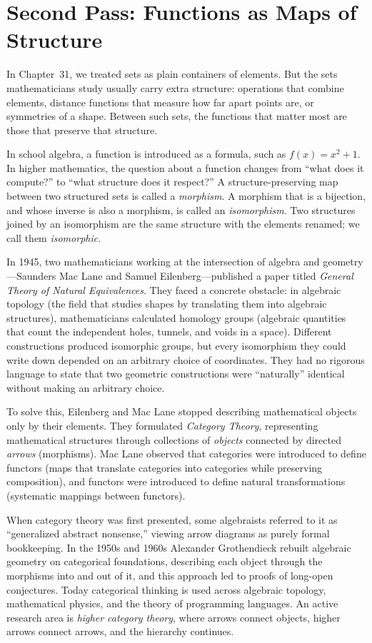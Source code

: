 \section{Second Pass: Functions as Maps of Structure}
\chapterline

In Chapter~31, we treated sets as plain containers of elements. But the sets mathematicians study usually carry extra structure: operations that combine elements, distance functions that measure how far apart points are, or symmetries of a shape. Between such sets, the functions that matter most are those that preserve that structure.

In school algebra, a function is introduced as a formula, such as $f(x) = x^2 + 1$. In higher mathematics, the question about a function changes from ``what does it compute?'' to ``what structure does it respect?'' A structure-preserving map between two structured sets is called a \emph{morphism}. A morphism that is a bijection, and whose inverse is also a morphism, is called an \emph{isomorphism}. Two structures joined by an isomorphism are the same structure with the elements renamed; we call them \emph{isomorphic}.

\begin{historybox}
In 1945, two mathematicians working at the intersection of algebra and geometry---Saunders Mac Lane and Samuel Eilenberg---published a paper titled \emph{General Theory of Natural Equivalences}. They faced a concrete obstacle: in algebraic topology (the field that studies shapes by translating them into algebraic structures), mathematicians calculated homology groups (algebraic quantities that count the independent holes, tunnels, and voids in a space). Different constructions produced isomorphic groups, but every isomorphism they could write down depended on an arbitrary choice of coordinates. They had no rigorous language to state that two geometric constructions were ``naturally'' identical without making an arbitrary choice.

To solve this, Eilenberg and Mac Lane stopped describing mathematical objects only by their elements. They formulated \emph{Category Theory}, representing mathematical structures through collections of \emph{objects} connected by directed \emph{arrows} (morphisms). Mac Lane observed that categories were introduced to define functors (maps that translate categories into categories while preserving composition), and functors were introduced to define natural transformations (systematic mappings between functors).

When category theory was first presented, some algebraists referred to it as ``generalized abstract nonsense,'' viewing arrow diagrams as purely formal bookkeeping. In the 1950s and 1960s Alexander Grothendieck rebuilt algebraic geometry on categorical foundations, describing each object through the morphisms into and out of it, and this approach led to proofs of long-open conjectures. Today categorical thinking is used across algebraic topology, mathematical physics, and the theory of programming languages. An active research area is \emph{higher category theory}, where arrows connect objects, higher arrows connect arrows, and the hierarchy continues.
\end{historybox}

